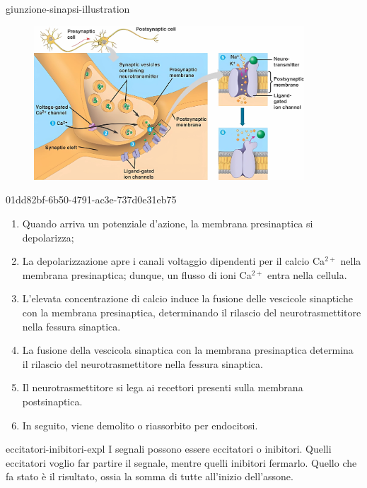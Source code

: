 \documentclass[preview]{standalone}
\begin{document}
\begin{snippet}{giunzione-sinapsi-illustration}
    \begin{center}
    \begin{figure}[ht]
        \centering
        \includegraphics[width=0.9\textwidth]{./resources/giunzione_sinapsi.png}
    \end{figure}
    \end{center}
\end{snippet}

\begin{snippet}{01dd82bf-6b50-4791-ac3e-737d0e31eb75}
    \begin{enumerate}
        \item Quando arriva un potenziale d'azione, la membrana presinaptica si depolarizza;
        \item La depolarizzazione apre i canali voltaggio dipendenti per il calcio Ca\({}^{2+}\) nella membrana
            presinaptica; dunque, un flusso di ioni Ca\({}^{2+}\) entra nella cellula.
        \item L'elevata concentrazione di calcio induce la fusione delle vescicole sinaptiche con la
            membrana presinaptica, determinando il rilascio del neurotrasmettitore nella fessura
            sinaptica.
        \item La fusione della vescicola sinaptica con la membrana presinaptica determina il rilascio del
        neurotrasmettitore nella fessura sinaptica.
        \item Il neurotrasmettitore si lega ai recettori presenti sulla membrana postsinaptica.
        \item In seguito, viene demolito o riassorbito per endocitosi.
    \end{enumerate}
\end{snippet}

\begin{snippet}{eccitatori-inibitori-expl}
    I segnali possono essere eccitatori o inibitori.
Quelli eccitatori voglio far partire il segnale, mentre quelli inibitori
fermarlo. Quello che fa stato è il risultato, ossia la somma di tutte
all'inizio dell'assone.
\end{snippet}
\end{document}
